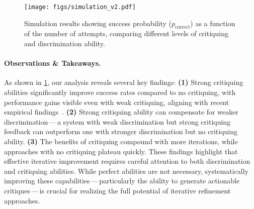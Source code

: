 \begin{figure}[t]
    \centering
    \texttt{[image: figs/simulation\_v2.pdf]}
    \vspace{-5mm}
    \caption{Simulation results showing success probability ($p_{\text{correct}}$) as a function of the number of attempts, comparing different levels of critiquing and discrimination ability.}
    \label{fig:simulation}
    \vspace{-5mm}
\end{figure}

\paragraph{Observations \& Takeaways.} 
As shown in \cref{fig:simulation}, our analysis reveals several key findings:
\textbf{(1)} Strong critiquing abilities significantly improve success rates compared to no critiquing, with performance gains visible even with weak critiquing, aligning with recent empirical findings~\cite{huang2023large}.
\textbf{(2)} Strong critiquing ability can compensate for weaker discrimination\,---\,a system with weak discrimination but strong critiquing feedback can outperform one with stronger discrimination but no critiquing ability.
\textbf{(3)} The benefits of critiquing compound with more iterations, while approaches with no critiquing plateau quickly.
These findings highlight that effective iterative improvement requires careful attention to both discrimination and critiquing abilities. While perfect abilities are not necessary, systematically improving these capabilities\,---\,particularly the ability to generate actionable critiques\,---\,is crucial for realizing the full potential of iterative refinement approaches.
